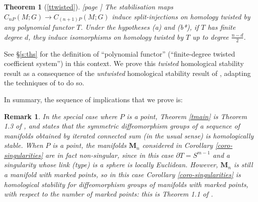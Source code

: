 \documentclass[reqno,a4paper]{article}
\numberwithin{equation}{section}
\theoremstyle{italicised}
\theoremstyle{upright}
\newtheorem{rmk}[thm]{Remark}
\theoremstyle{italicised-restate}
\newtheorem{rthm}{Theorem}
\begin{document}
\begin{rthm}[\ref{ttwisted}] \textup{[page \pageref{ttwisted}]}
The stabilisation maps $C_{nP}(M;G) \to C_{(n+1)P}(M;G)$ induce split-injections on homology twisted by any polynomial functor $T$. Under the hypotheses \textup{(a)} and \textup{(b*)}, if $T$ has finite degree $d$, they induce isomorphisms on homology twisted by $T$ up to degree $\tfrac{n-d}{2}$.
\end{rthm}

See \S\ref{s:ths} for the definition of ``polynomial functor'' (``finite-degree twisted coefficient system'') in this context. We prove this \emph{twisted} homological stability result as a consequence of the \emph{untwisted} homological stability result of \cite{Palmer2018HomologicalstabilitymoduliI}, adapting the techniques of \cite{Palmer2018Twistedhomologicalstability} to do so.

\label{diagram-implications}
In summary, the sequence of implications that we prove is:
\begin{center}
\end{center}

\begin{rmk}\label{r:after-linear-diagram}
In the special case where $P$ is a point, Theorem \ref{tmain} is Theorem 1.3 of \cite{Tillmann2016Homologystabilitysymmetric}, and states that the symmetric diffeomorphism groups of a sequence of manifolds obtained by iterated connected sum (in the usual sense) is homologically stable. When $P$ is a point, the manifolds $\mathbf{M}_n$ considered in Corollary \ref{coro-singularities} are in fact \emph{non}-singular, since in this case $\partial T = S^{m-1}$ and a singularity whose link (type) is a sphere is locally Euclidean. However, $\mathbf{M}_n$ is still a manifold with marked points, so in this case Corollary \ref{coro-singularities} is homological stability for diffeomorphism groups of manifolds with marked points, with respect to the number of marked points: this is Theorem 1.1 of \cite{Tillmann2016Homologystabilitysymmetric}.
\end{rmk}
\end{document}

